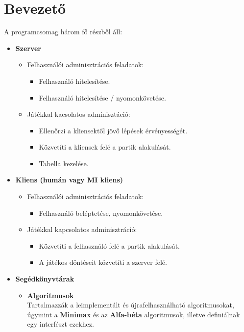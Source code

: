 \documentclass[twoside, a4paper, 12pt]{article}
\begin{document}
\section{Bevezető}
A programcsomag három fő részből áll:
\begin{itemize}
	\item \textbf{Szerver}
	\begin{itemize}
	
		\item Felhasználói adminisztrációs feladatok:
		\begin{itemize}
			\item Felhasználó hitelesítése.
			\item Felhasználó hitelesítése / nyomonkövetése.
		\end{itemize}

		\item Játékkal kacsolatos adminisztáció:
		\begin{itemize}
			\item Ellenőrzi a kliensektől jövő lépések érvényességét.
			\item Közvetíti a kliensek felé a partik alakulását.
			\item Tabella kezelése.
		\end{itemize}		
		
	\end{itemize}

	\item \textbf{Kliens (humán vagy MI kliens)}
	\begin{itemize}
	
		\item Felhasználói adminisztrációs feladatok:
		\begin{itemize}
			\item Felhasználó beléptetése, nyomonkövetése.
		\end{itemize}

		\item Játékkal kapcsolatos adminisztráció:
		\begin{itemize}
			\item Közvetíti a felhasználó felé a partik alakulását.
			\item A játékos döntéseit közvetíti a szerver felé.
		\end{itemize}
		
	\end{itemize}
	
	\item \textbf{Segédkönyvtárak} \\
	\begin{itemize}
		\item \textbf{Algoritmusok} \\
		Tartalmazzák a leimplementált és újrafelhasználható algoritmusokat, úgymint a \textbf{Minimax} és az \textbf{Alfa-béta} algoritmusok, illetve definiálnak egy interfészt ezekhez.


\end{itemize}
\end{itemize}
\end{document}
